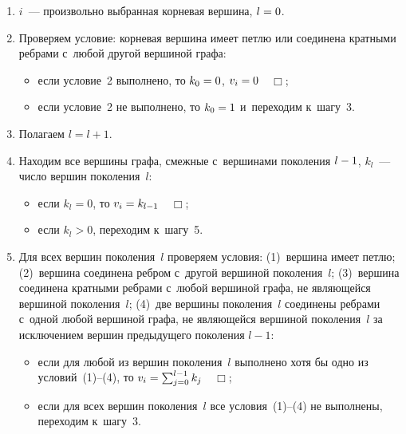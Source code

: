 \begin{multicols}{2}
\noindent
\begin{enumerate}
\item $i$~--- произвольно выбранная корневая вершина, $l\hm=0$.
\item Проверяем условие: корневая вершина имеет петлю или соединена кратными 
ребрами с~любой другой вершиной графа:
\begin{itemize}
\item если условие~2 выполнено, то $k_0\hm=0$, $v_i\hm=0$~~$\Box$;
\item если условие~2 не выполнено, то $k_0\hm=1$ и~переходим к~шагу~3.
\end{itemize}
\item Полагаем $l=l+1$.
\item Находим все вершины графа, смежные с~вершинами поколения $l\hm-1$, $k_l$~--- 
число вершин поколения~$l$:
\begin{itemize}
\item если $k_l=0$, то $v_i\hm=k_{l-1}$~~$\Box$;
\item если $k_l>0$, переходим к~шагу~5.
\end{itemize}
\item Для всех вершин поколения~$l$ проверяем условия: (1)~вершина имеет петлю; 
(2)~вершина соединена ребром с~другой вершиной поколения~$l$; (3)~вершина 
соединена кратными ребрами с~любой вершиной графа, не являющейся вершиной 
поколения~$l$; (4)~две вершины поколения~$l$ соединены ребрами с~одной любой 
вершиной графа, не являющейся вершиной поколения~$l$ за исключением вершин 
предыдущего поколения $l-1$:
\begin{itemize}
\item если для любой из вершин поколения~$l$ выполнено хотя бы одно из условий~(1)--(4), 
то $v_i\hm=\sum_{j=0}^{l-1}k_j$~~$\Box$;\\[-13.5pt]
\item если для всех вершин поколения~$l$ все условия~(1)--(4) не выполнены, 
переходим к~шагу~3.
\end{itemize}
\end{enumerate}

\begin{table*}[b]\small %
\vspace*{-12pt}
\begin{minipage}[t]{80mm}
\begin{center}
\parbox{50mm}{
}


\end{center}
\end{minipage}
\end{table*}
\end{multicols}

